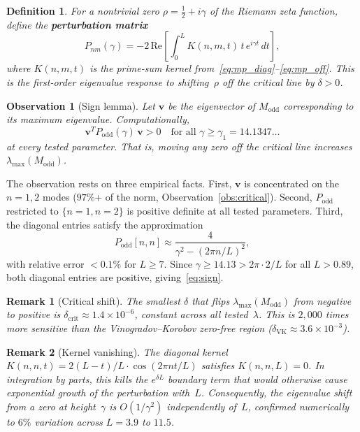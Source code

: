 \documentclass[11pt,a4paper]{article}
\newtheorem{observation}{Observation}[section]
\newtheorem{definition}{Definition}[section]
\newtheorem{remark}{Remark}[section]
\begin{document}
\begin{definition}
For a nontrivial zero $\rho = \tfrac{1}{2} + i\gamma$ of the Riemann zeta function, define the \textbf{perturbation matrix}
\begin{equation}\label{eq:Pmatrix}
P_{nm}(\gamma) = -2\,\mathrm{Re}\!\left[\int_0^L K(n,m,t)\, t\, e^{i\gamma t}\, dt\right],
\end{equation}
where $K(n,m,t)$ is the prime-sum kernel from~\eqref{eq:mp_diag}--\eqref{eq:mp_off}. This is the first-order eigenvalue response to shifting~$\rho$ off the critical line by $\delta > 0$.
\end{definition}

\begin{observation}[Sign lemma]\label{thm:sign}
Let $\mathbf{v}$ be the eigenvector of $M_{\mathrm{odd}}$ corresponding to its maximum eigenvalue. Computationally,
\begin{equation}\label{eq:sign}
\mathbf{v}^T P_{\mathrm{odd}}(\gamma)\, \mathbf{v} > 0 \quad \text{for all } \gamma \geq \gamma_1 = 14.1347\ldots
\end{equation}
at every tested parameter. That is, moving any zero off the critical line increases $\lambda_{\max}(M_{\mathrm{odd}})$.
\end{observation}

The observation rests on three empirical facts. First, $\mathbf{v}$ is concentrated on the $n = 1, 2$ modes ($97\%$+ of the norm, Observation~\ref{obs:critical}). Second, $P_{\mathrm{odd}}$ restricted to $\{n=1, n=2\}$ is positive definite at all tested parameters. Third, the diagonal entries satisfy the approximation
\begin{equation}\label{eq:Pdiag}
P_{\mathrm{odd}}[n,n] \approx \frac{4}{\gamma^2 - (2\pi n/L)^2},
\end{equation}
with relative error $< 0.1\%$ for $L \geq 7$. Since $\gamma \geq 14.13 > 2\pi \cdot 2 / L$ for all $L > 0.89$, both diagonal entries are positive, giving~\eqref{eq:sign}.

\begin{remark}[Critical shift]
The smallest $\delta$ that flips $\lambda_{\max}(M_{\mathrm{odd}})$ from negative to positive is $\delta_{\mathrm{crit}} \approx 1.4 \times 10^{-6}$, constant across all tested~$\lambda$. This is $2{,}000$ times more sensitive than the Vinogradov--Korobov zero-free region ($\delta_{\mathrm{VK}} \approx 3.6 \times 10^{-3}$).
\end{remark}

\begin{remark}[Kernel vanishing]\label{rem:KL0}
The diagonal kernel $K(n,n,t) = 2(L-t)/L \cdot \cos(2\pi n t/L)$ satisfies $K(n,n,L) = 0$. In integration by parts, this kills the $e^{\delta L}$ boundary term that would otherwise cause exponential growth of the perturbation with~$L$. Consequently, the eigenvalue shift from a zero at height~$\gamma$ is $O(1/\gamma^2)$ \emph{independently of~$L$}, confirmed numerically to $6\%$ variation across $L = 3.9$ to $11.5$.
\end{remark}
\end{document}
